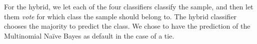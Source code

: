 For the hybrid, we let each of the four classifiers classify the sample, and then let them \emph{vote} for which class the sample should belong to. The hybrid classifier chooses the majority to predict the class. We chose to have the prediction of the Multinomial Naïve Bayes as default in the case of a tie.